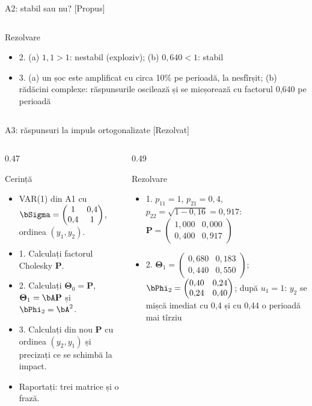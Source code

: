 \begin{frame}{A2: stabil sau nu? [Propus]}
\begin{columns}[T]
\begin{column}{\solw}
{\begin{exampleblock}{Rezolvare}
\begin{itemize}
    \item 2. (a) $1{,}1 > 1$: nestabil (exploziv); (b) $0{,}640 < 1$: stabil
    \item 3. (a) un șoc este amplificat cu circa 10\% pe perioadă, la nesfîrșit; (b) rădăcini complexe: răspunsurile oscilează și se micșorează cu factorul 0{,}640 pe perioadă
\end{itemize}
\end{exampleblock}
}
\end{column}
\end{columns}
\end{frame}

\begin{frame}{A3: răspunsuri la impuls ortogonalizate [Rezolvat]}
\itemsize{\scriptsize}
\begin{columns}[T]
\begin{column}{0.47\textwidth}
\begin{block}{Cerință}
\begin{itemize}
    \item VAR(1) din A1 cu $\bSigma = \begin{pmatrix} 1 & 0{,}4 \\ 0{,}4 & 1 \end{pmatrix}$, ordinea $(y_1, y_2)$.
    \item 1. Calculați factorul Cholesky $\mathbf{P}$.
    \item 2. Calculați $\boldsymbol{\Theta}_0 = \mathbf{P}$, $\boldsymbol{\Theta}_1 = \bA\mathbf{P}$ și $\bPhi_2 = \bA^2$.
    \item 3. Calculați din nou $\mathbf{P}$ cu ordinea $(y_2, y_1)$ și precizați ce se schimbă la impact.
    \item Raportați: trei matrice și o frază.
\end{itemize}
\end{block}
\end{column}
\begin{column}{0.49\textwidth}
\begin{exampleblock}{Rezolvare}
\begin{itemize}
    \item 1. $p_{11} = 1$, $p_{21} = 0{,}4$, $p_{22} = \sqrt{1 - 0{,}16} = 0{,}917$: $\mathbf{P} = \begin{pmatrix} 1{,}000 & 0{,}000 \\ 0{,}400 & 0{,}917 \end{pmatrix}$
    \item 2. $\boldsymbol{\Theta}_1 = \begin{pmatrix} 0{,}680 & 0{,}183 \\ 0{,}440 & 0{,}550 \end{pmatrix}$; $\bPhi_2 = \begin{pmatrix} 0{,}40 & 0{,}24 \\ 0{,}24 & 0{,}40 \end{pmatrix}$; după $u_1 = 1$: $y_2$ se mișcă imediat cu 0,4 și cu 0{,}44 o perioadă mai tîrziu

\end{itemize}
\end{exampleblock}
\end{column}
\end{columns}
\end{frame}
